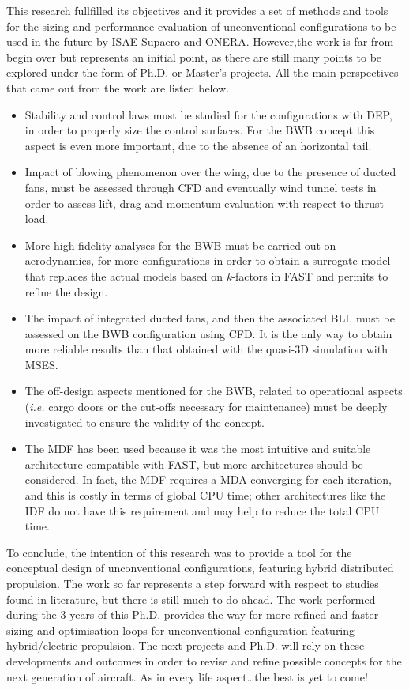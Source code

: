 This research fullfilled its objectives and it provides a set of methods and tools for the sizing and performance evaluation of unconventional configurations to be used in the future by ISAE-Supaero and ONERA. 
However,the work is far from begin over but represents an initial point, as there are still many points to be explored under the form of Ph.D. or Master's projects. 
All the main perspectives that came out from the work are listed below.
\begin{itemize}
	\item Stability and control laws must be studied for the configurations with DEP, in order to properly size the control surfaces. 
	For the BWB concept this aspect is even more important, due to the absence of an horizontal tail. 
	
	\item Impact of blowing phenomenon over the wing, due to the presence of ducted fans, must be assessed through CFD and eventually wind tunnel tests in order to assess lift, drag and momentum evaluation with respect to thrust load. 
	
	\item More high fidelity analyses for the BWB must be carried out on aerodynamics, for more configurations in order to obtain a surrogate model that replaces the actual models based on \textit{k}-factors in FAST and permits to refine the design. 
	
	\item The impact of integrated ducted fans, and then the associated BLI, must be assessed on the BWB configuration using CFD.
	It is the only way to obtain more reliable results than that obtained with the quasi-3D simulation with MSES. 
	
	\item The off-design aspects mentioned for the BWB, related to operational aspects (\textit{i.e.} cargo doors or the cut-offs necessary for maintenance) must be deeply investigated to ensure the validity of the concept. 
	
	\item The MDF has been used because it was the most intuitive and suitable architecture compatible with FAST, but more architectures should be considered. 
	In fact, the MDF requires a MDA converging for each iteration, and this is costly in terms of global CPU time; other architectures like the IDF do not have this requirement and may help to reduce the total CPU time. 
\end{itemize}

To conclude, the intention of this research was to provide a tool for the conceptual design of unconventional configurations, featuring hybrid distributed propulsion. 
The work so far represents a step forward with respect to studies found in literature, but there is still much to do ahead. 
The work performed during the 3 years of this Ph.D. provides the way for more refined and faster sizing and optimisation loops for unconventional configuration featuring hybrid/electric propulsion. 
The next projects and Ph.D. will rely on these developments and outcomes in order to revise and refine possible concepts for the next generation of aircraft. 
As in every life aspect\dots the best is yet to come!